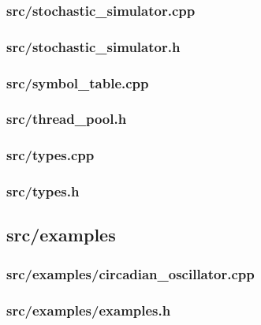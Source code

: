 \subsubsection{src/stochastic\_simulator.cpp}

\newpage
\subsubsection{src/stochastic\_simulator.h}

\newpage
\subsubsection{src/symbol\_table.cpp}

\newpage
\subsubsection{src/thread\_pool.h}

\newpage
\subsubsection{src/types.cpp}

\newpage
\subsubsection{src/types.h}


\newpage
\subsection{src/examples}
\subsubsection{src/examples/circadian\_oscillator.cpp}\label{subsection:circadian_oscillator}

\newpage
\subsubsection{src/examples/examples.h}

\newpage
